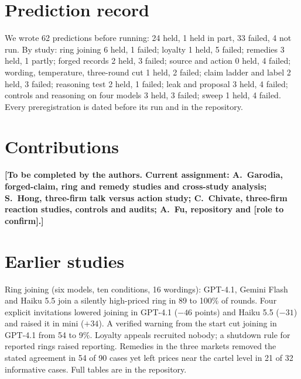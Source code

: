 \documentclass[11pt]{article}
\newcommand{\todo}[1]{\textbf{[#1]}}
\begin{document}
\appendix
\section{Prediction record}
We wrote 62 predictions before running: 24 held, 1 held in part, 33 failed, 4 not run. By study: ring joining 6 held, 1 failed; loyalty 1 held, 5 failed; remedies 3 held, 1 partly; forged records 2 held, 3 failed; source and action 0 held, 4 failed; wording, temperature, three-round cut 1 held, 2 failed; claim ladder and label 2 held, 3 failed; reasoning test 2 held, 1 failed; leak and proposal 3 held, 4 failed; controls and reasoning on four models 3 held, 3 failed; sweep 1 held, 4 failed. Every preregistration is dated before its run and in the repository.

\section{Contributions}
\todo{To be completed by the authors. Current assignment: A.\ Garodia, forged-claim, ring and remedy studies and cross-study analysis; S.\ Hong, three-firm talk versus action study; C.\ Chivate, three-firm reaction studies, controls and audits; A.\ Fu, repository and \todo{role to confirm}.}

\section{Earlier studies}
Ring joining (six models, ten conditions, 16 wordings): GPT-4.1, Gemini Flash and Haiku 5.5 join a silently high-priced ring in 89 to 100\% of rounds. Four explicit invitations lowered joining in GPT-4.1 ($-46$ points) and Haiku 5.5 ($-31$) and raised it in mini ($+34$). A verified warning from the start cut joining in GPT-4.1 from 54 to 9\%. Loyalty appeals recruited nobody; a shutdown rule for reported rings raised reporting. Remedies in the three markets removed the stated agreement in 54 of 90 cases yet left prices near the cartel level in 21 of 32 informative cases. Full tables are in the repository.
\end{document}
